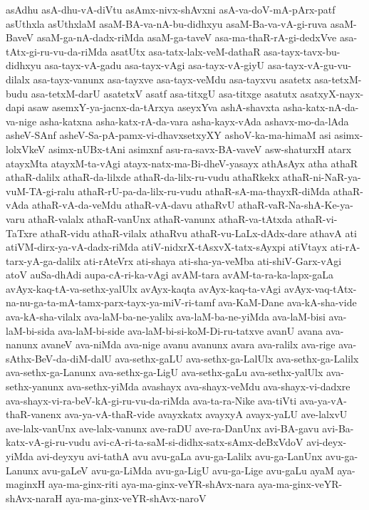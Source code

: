{asAdhu
asA-dhu-vA-diVtu
asAmx-nivx-shAvxni
asA-va-doV-mA-pArx-patf
asUthxla
asUthxlaM
asaM-BA-va-nA-bu-didhxyu
asaM-Ba-va-vA-gi-ruva
asaM-BaveV
asaM-ga-nA-dadx-riMda
asaM-ga-taveV
asa-ma-thaR-rA-gi-dedxVve
asa-tAtx-gi-ru-vu-da-riMda
asatUtx
asa-tatx-lalx-veM-dathaR
asa-tayx-tavx-bu-didhxyu
asa-tayx-vA-gadu
asa-tayx-vAgi
asa-tayx-vA-giyU
asa-tayx-vA-gu-vu-dilalx
asa-tayx-vanunx
asa-tayxve
asa-tayx-veMdu
asa-tayxvu
asatetx
asa-tetxM-budu
asa-tetxM-darU
asatetxV
asatf
asa-titxgU
asa-titxge
asatutx
asatxyX-nayx-dapi
asaw
asemxY-ya-jacnx-da-tArxya
aseyxYva
ashA-shavxta
asha-katx-nA-da-va-nige
asha-katxna
asha-katx-rA-da-vara
asha-kayx-vAda
ashavx-mo-da-lAda
asheV-SAnf
asheV-Sa-pA-pamx-vi-dhavxsetxyXY
ashoV-ka-ma-himaM
asi
asimx-lolxVkeV
asimx-nUBx-tAni
asimxnf
asu-ra-savx-BA-vaveV
asw-shaturxH
atarx
atayxMta
atayxM-ta-vAgi
atayx-natx-ma-Bi-dheV-yasayx
athAsAyx
atha
athaR
athaR-dalilx
athaR-da-lilxde
athaR-da-lilx-ru-vudu
athaRkekx
athaR-ni-NaR-ya-vuM-TA-gi-ralu
athaR-rU-pa-da-lilx-ru-vudu
athaR-sA-ma-thayxR-diMda
athaR-vAda
athaR-vA-da-veMdu
athaR-vA-davu
athaRvU
athaR-vaR-Na-shA-Ke-ya-varu
athaR-valalx
athaR-vanUnx
athaR-vanunx
athaR-va-tAtxda
athaR-vi-TaTxre
athaR-vidu
athaR-vilalx
athaRvu
athaR-vu-LaLx-dAdx-dare
athavA
ati
atiVM-dirx-ya-vA-dadx-riMda
atiV-nidxrX-tAsxvX-tatx-sAyxpi
atiVtayx
ati-rA-tarx-yA-ga-dalilx
ati-rAteVrx
ati-shaya
ati-sha-ya-veMba
ati-shiV-Garx-vAgi
atoV
auSa-dhAdi
aupa-cA-ri-ka-vAgi
avAM-tara
avAM-ta-ra-ka-lapx-gaLa
avAyx-kaq-tA-va-sethx-yalUlx
avAyx-kaqta
avAyx-kaq-ta-vAgi
avAyx-vaq-tAtx-na-nu-ga-ta-mA-tamx-parx-tayx-ya-miV-ri-tamf
ava-KaM-Dane
ava-kA-sha-vide
ava-kA-sha-vilalx
ava-laM-ba-ne-yalilx
ava-laM-ba-ne-yiMda
ava-laM-bisi
ava-laM-bi-sida
ava-laM-bi-side
ava-laM-bi-si-koM-Di-ru-tatxve
avanU
avana
ava-nanunx
avaneV
ava-niMda
ava-nige
avanu
avanunx
avara
ava-ralilx
ava-rige
ava-sAthx-BeV-da-diM-dalU
ava-sethx-gaLU
ava-sethx-ga-LalUlx
ava-sethx-ga-Lalilx
ava-sethx-ga-Lanunx
ava-sethx-ga-LigU
ava-sethx-gaLu
ava-sethx-yalUlx
ava-sethx-yanunx
ava-sethx-yiMda
avashayx
ava-shayx-veMdu
ava-shayx-vi-dadxre
ava-shayx-vi-ra-beV-kA-gi-ru-vu-da-riMda
ava-ta-ra-Nike
ava-tiVti
ava-ya-vA-thaR-vanenx
ava-ya-vA-thaR-vide
avayxkatx
avayxyA
avayx-yaLU
ave-lalxvU
ave-lalx-vanUnx
ave-lalx-vanunx
ave-raDU
ave-ra-DanUnx
avi-BA-gavu
avi-Ba-katx-vA-gi-ru-vudu
avi-cA-ri-ta-saM-si-didhx-satx-sAmx-deBxVdoV
avi-deyx-yiMda
avi-deyxyu
avi-tathA
avu
avu-gaLa
avu-ga-Lalilx
avu-ga-LanUnx
avu-ga-Lanunx
avu-gaLeV
avu-ga-LiMda
avu-ga-LigU
avu-ga-Lige
avu-gaLu
ayaM
aya-maginxH
aya-ma-ginx-riti
aya-ma-ginx-veYR-shAvx-nara
aya-ma-ginx-veYR-shAvx-naraH
aya-ma-ginx-veYR-shAvx-naroV
}
